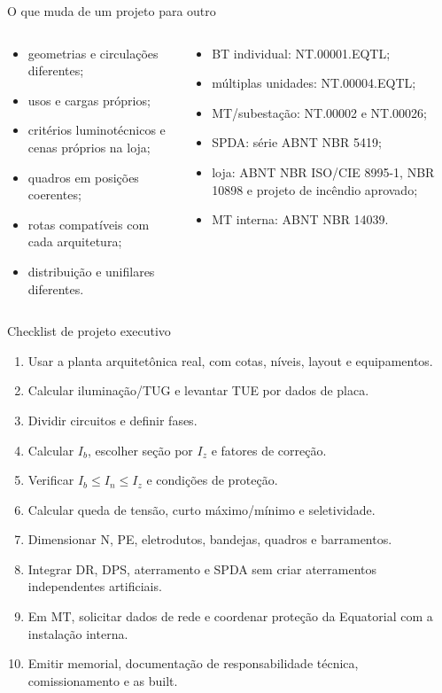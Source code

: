 \begin{frame}{O que muda de um projeto para outro}
\small
\begin{columns}[T,onlytextwidth]
\begin{caixaProjeto}[title=Não são a mesma planta reciclada]
\begin{itemize}
\item geometrias e circulações diferentes;
\item usos e cargas próprios;
\item critérios luminotécnicos e cenas próprios na loja;
\item quadros em posições coerentes;
\item rotas compatíveis com cada arquitetura;
\item distribuição e unifilares diferentes.
\end{itemize}
\end{caixaProjeto}
\begin{caixaNorma}[title=Norma conforme o caso]
\begin{itemize}
\item BT individual: NT.00001.EQTL;
\item múltiplas unidades: NT.00004.EQTL;
\item MT/subestação: NT.00002 e NT.00026;
\item SPDA: série ABNT NBR 5419;
\item loja: ABNT NBR ISO/CIE 8995-1, NBR 10898 e projeto de incêndio aprovado;
\item MT interna: ABNT NBR 14039.
\end{itemize}
\end{caixaNorma}
\end{columns}
\end{frame}

\begin{frame}{Checklist de projeto executivo}
\small
\begin{enumerate}
\item Usar a planta arquitetônica real, com cotas, níveis, layout e equipamentos.
\item Calcular iluminação/TUG e levantar TUE por dados de placa.
\item Dividir circuitos e definir fases.
\item Calcular $I_b$, escolher seção por $I_z$ e fatores de correção.
\item Verificar $I_b\le I_n\le I_z$ e condições de proteção.
\item Calcular queda de tensão, curto máximo/mínimo e seletividade.
\item Dimensionar N, PE, eletrodutos, bandejas, quadros e barramentos.
\item Integrar DR, DPS, aterramento e SPDA sem criar aterramentos independentes artificiais.
\item Em MT, solicitar dados de rede e coordenar proteção da Equatorial com a instalação interna.
\item Emitir memorial, documentação de responsabilidade técnica, comissionamento e as built.
\end{enumerate}
\end{frame}
